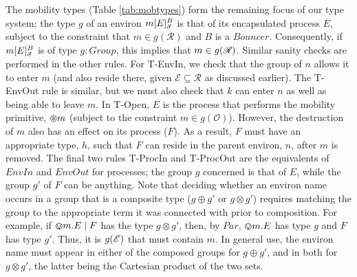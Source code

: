 The mobility types (Table \ref{tab:mobtypes}) form the remaining focus
of our type system; the type $g$ of an environ
${m}[ E ]^{B}_{\vec{\sigma}}$ is that of its encapsulated process
$E$, subject to the constraint that $m \in g(\mathscr{R})$ and $B$ is
a $Bouncer$. Consequently, if ${m}[ E ]^{B}_{\vec{\sigma}}$ is of
type $g : Group$, this implies that $m \in g(\mathscr{R})$.  Similar
sanity checks are performed in the other rules. For T-EnvIn, we
check that the group of $n$ allows it to enter $m$ (and also reside
there, given $\mathscr{E} \subseteq \mathscr{R}$ as discussed
earlier).  The T-EnvOut rule is similar, but we must also check that
$k$ can enter $n$ as well as being able to leave $m$.  In T-Open,
$E$ is the process that performs the mobility primitive, $\varoast m$
(subject to the constraint $m \in g(\mathscr{O})$).  However, the
destruction of $m$ also has an effect on its process ($F$).  As a
result, $F$ must have an appropriate type, $h$, such that $F$ can
reside in the parent environ, $n$, after $m$ is removed.  The final
two rules T-ProcIn and T-ProcOut are the equivalents of $EnvIn$
and $EnvOut$ for processes; the group $g$ concerned is that of $E$,
while the group $g'$ of $F$ can be anything.  Note that deciding
whether an environ name occurs in a group that is a composite type ($g
\oplus g'$ or $g \otimes g'$) requires matching the group to the
appropriate term it was connected with prior to composition.  For
example, if $\varovee m.E \;|\; F$ has the type $g \otimes g'$, then, by
$Par$, $\varovee m.E$ has type $g$ and $F$ has type $g'$.  Thus, it is
$g(\mathscr{E})$ that must contain $m$.  In general use, the environ name
must appear in either of the composed groups for $g \oplus g'$, and in
both for $g \otimes g'$, the latter being the Cartesian product of the
two sets.

